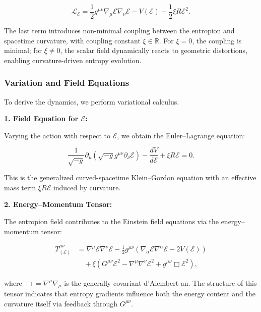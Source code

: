 \documentclass[12pt]{article}
\begin{document}
\begin{equation}
\mathcal{L}_{\mathcal{E}} = \frac{1}{2} g^{\mu\nu} \nabla_\mu \mathcal{E} \nabla_\nu \mathcal{E} - V(\mathcal{E}) - \frac{1}{2} \xi R \mathcal{E}^2.
\end{equation}

The last term introduces non-minimal coupling between the entropion and spacetime curvature, with coupling constant \( \xi \in \mathbb{R} \). For \( \xi = 0 \), the coupling is minimal; for \( \xi \neq 0 \), the scalar field dynamically reacts to geometric distortions, enabling curvature-driven entropy evolution.

\subsubsection*{Variation and Field Equations}

To derive the dynamics, we perform variational calculus.

\vspace{0.2cm}
\noindent
\textbf{1. Field Equation for \(\mathcal{E}\):}

Varying the action with respect to \( \mathcal{E} \), we obtain the Euler–Lagrange equation:

\begin{equation}
\frac{1}{\sqrt{-g}} \partial_\mu \left( \sqrt{-g} g^{\mu\nu} \partial_\nu \mathcal{E} \right) - \frac{dV}{d\mathcal{E}} + \xi R \mathcal{E} = 0.
\end{equation}

This is the generalized curved-spacetime Klein–Gordon equation with an effective mass term \( \xi R \mathcal{E} \) induced by curvature.

\vspace{0.2cm}
\noindent
\textbf{2. Energy–Momentum Tensor:}

The entropion field contributes to the Einstein field equations via the energy–momentum tensor:

\begin{align}
T^{\mu\nu}_{(\mathcal{E})} &= \nabla^\mu \mathcal{E} \nabla^\nu \mathcal{E} - \frac{1}{2} g^{\mu\nu} \left( \nabla_\alpha \mathcal{E} \nabla^\alpha \mathcal{E} - 2 V(\mathcal{E}) \right) \nonumber \\
&\quad + \xi \left( G^{\mu\nu} \mathcal{E}^2 - \nabla^\mu \nabla^\nu \mathcal{E}^2 + g^{\mu\nu} \Box \mathcal{E}^2 \right),
\end{align}

where \( \Box = \nabla^\mu \nabla_\mu \) is the generally covariant d’Alembert an. The structure of this tensor indicates that entropy gradients influence both the energy content and the curvature itself via feedback through \( G^{\mu\nu} \).
\end{document}
